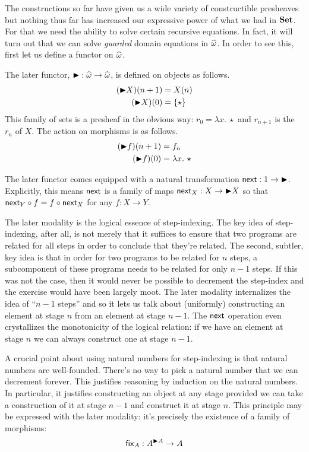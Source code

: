 The constructions so far have given us a wide variety of constructible
presheaves but nothing thus far has increased our expressive power of
what we had in $\mathbf{Set}$. For that we need the ability to solve certain
recursive equations. In fact, it will turn out that we can solve
\emph{guarded} domain equations in $\widehat{\omega}$. In order to
see this, first let us define a functor on $\widehat{\omega}$.
\begin{defn}
  The later functor,
  ${\blacktriangleright} : \widehat{\omega} \to \widehat{\omega}$, is defined
  on objects as follows.
  \begin{align*}
    ({\blacktriangleright} X)(n + 1) &= X(n)\\
    ({\blacktriangleright} X)(0) &= \{\star\}
  \end{align*}
  This family of sets is a presheaf in the obvious way:
  $r_0 = \lambda x.\ \star$ and $r_{n + 1}$ is the $r_n$ of $X$. The
  action on morphisms is as follows.
  \begin{align*}
    ({\blacktriangleright} f)(n + 1) &= f_n\\
    ({\blacktriangleright} f)(0) &= \lambda x.\ \star
  \end{align*}

  The later functor comes equipped with a natural transformation
  $\mathsf{next} : 1 \to {\blacktriangleright}$. Explicitly, this means $\mathsf{next}$ is a family
  of maps $\mathsf{next}_X : X \to {\blacktriangleright} X$ so that
  $\mathsf{next}_Y \circ f = f \circ \mathsf{next}_X$ for any $f : X \to Y$.
\end{defn}
The later modality is the logical essence of step-indexing. The key
idea of step-indexing, after all, is not merely that it suffices to
ensure that two programs are related for all steps in order to
conclude that they're related. The second, subtler, key idea is that
in order for two programs to be related for $n$ steps, a subcomponent
of these programs needs to be related for only $n - 1$ steps. If this
was not the case, then it would never be possible to decrement the
step-index and the exercise would have been largely moot. The later
modality internalizes the idea of ``$n - 1$ steps'' and so it lets us
talk about (uniformly) constructing an element at stage $n$ from an
element at stage $n - 1$. The $\mathsf{next}$ operation even crystallizes the
monotonicity of the logical relation: if we have an element at stage
$n$ we can always construct one at stage $n - 1$.

A crucial point about using natural numbers for step-indexing is that
natural numbers are well-founded. There's no way to pick a natural
number that we can decrement forever. This justifies reasoning by
induction on the natural numbers. In particular, it justifies
constructing an object at any stage provided we can take a
construction of it at stage $n - 1$ and construct it at stage
$n$. This principle may be expressed with the later modality: it's
precisely the existence of a family of morphisms:
\[
  \mathsf{fix}_A : A^{{\blacktriangleright} A} \to A
\]

